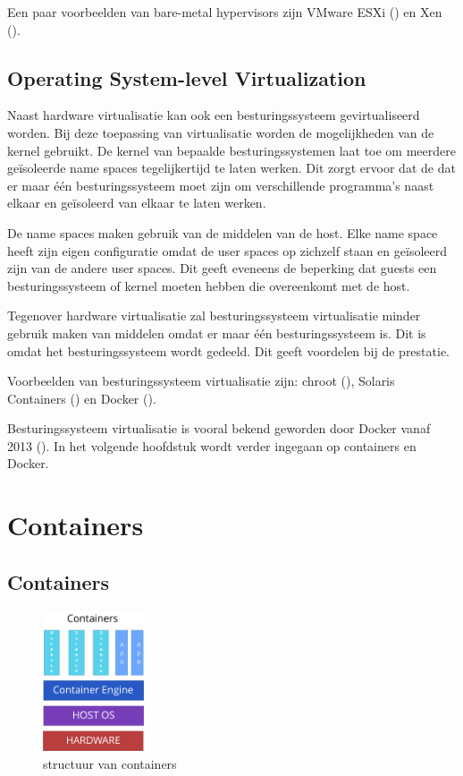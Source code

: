 \documentclass[pdftex,a4paper,12pt,twoside]{report}
\begin{document}
Een paar voorbeelden van bare-metal hypervisors zijn VMware ESXi (\cite{vmware_vmware_2016}) en Xen (\cite{xen_project_xen_2016}).

\section{Operating System-level Virtualization}

Naast hardware virtualisatie kan ook een besturingssysteem gevirtualiseerd worden. Bij deze toepassing van virtualisatie worden de mogelijkheden van de kernel gebruikt. De kernel van bepaalde besturingssystemen laat toe om meerdere geïsoleerde name spaces tegelijkertijd te laten werken. Dit zorgt ervoor dat de dat er maar één besturingssysteem moet zijn om verschillende programma's naast elkaar en geïsoleerd van elkaar te laten werken.

De name spaces maken gebruik van de middelen van de host. Elke name space heeft zijn eigen configuratie omdat de user spaces op zichzelf staan en geïsoleerd zijn van de andere user spaces. Dit geeft eveneens de beperking dat guests een besturingssysteem of kernel moeten hebben die overeenkomt met de host.

Tegenover hardware virtualisatie zal besturingssysteem virtualisatie minder gebruik maken van middelen omdat er maar één besturingssysteem is. Dit is omdat het besturingssysteem wordt gedeeld. Dit geeft voordelen bij de prestatie.

Voorbeelden van besturingssysteem virtualisatie zijn: chroot (\cite{linux_chroot2_????}), Solaris Containers (\cite{oracle_solaris_2016}) en Docker (\cite{docker_docker_2016}).

Besturingssysteem virtualisatie is vooral bekend geworden door Docker vanaf 2013 (\cite{hykes_future_2013}). In het volgende hoofdstuk wordt verder ingegaan op containers en Docker.

\chapter{Containers}
\label{ch:Containers}

\section{Containers}

\begin{figure}
    \centering
    \includegraphics[width=3cm]{img/container}
    \caption{structuur van containers}
    \label{fig:containers}
\end{figure}
\end{document}
